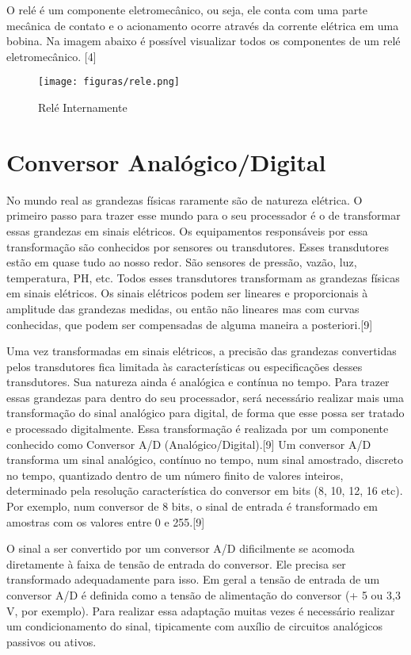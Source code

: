 O relé é um componente eletromecânico, ou seja, ele conta com uma parte mecânica de contato e o acionamento ocorre através da corrente elétrica em uma bobina. Na imagem abaixo é possível visualizar todos os componentes de um relé eletromecânico\cite{braga2012}. [4]

\begin{figure}[H]
	\centering
	\texttt{[image: figuras/rele.png]}
	\caption{Relé Internamente} \label{rele}
\end{figure}

\section{Conversor Analógico/Digital}

No mundo real as grandezas físicas raramente são de natureza elétrica. O primeiro passo para trazer esse mundo para o seu processador é o de transformar essas grandezas em sinais elétricos. Os equipamentos responsáveis por essa transformação são conhecidos por sensores ou transdutores. Esses transdutores estão em quase tudo ao nosso redor. São sensores de pressão, vazão, luz, temperatura, PH, etc. Todos esses transdutores transformam as grandezas físicas em sinais elétricos. Os sinais elétricos podem ser lineares e proporcionais à amplitude das grandezas medidas, ou então não lineares mas com curvas conhecidas, que podem ser compensadas de alguma maneira a posteriori\cite{braga2013}.[9]

Uma vez transformadas em sinais elétricos, a precisão das grandezas convertidas pelos transdutores fica limitada às características ou especificações desses transdutores. Sua natureza ainda é analógica e contínua no tempo. Para trazer essas grandezas para dentro do seu processador, será necessário realizar mais uma transformação do sinal analógico para digital, de forma que esse possa ser tratado e processado digitalmente. Essa transformação é realizada por um componente conhecido como Conversor A/D (Analógico/Digital)\cite{braga2013}.[9]
Um conversor A/D transforma um sinal analógico, contínuo no tempo, num sinal amostrado, discreto no tempo, quantizado dentro de um número finito de valores inteiros, determinado pela resolução característica do conversor em bits (8, 10, 12, 16 etc). Por exemplo, num conversor de 8 bits, o sinal de entrada é transformado em amostras com os valores entre 0 e 255\cite{braga2013}.[9]

O sinal a ser convertido por um conversor A/D dificilmente se acomoda diretamente à faixa de tensão de entrada do conversor. Ele precisa ser transformado adequadamente para isso. Em geral a tensão de entrada de um conversor A/D é definida como a tensão de alimentação do conversor (+ 5 ou 3,3 V, por exemplo). Para realizar essa adaptação muitas vezes é necessário realizar um condicionamento do sinal, tipicamente com auxílio de circuitos analógicos passivos ou ativos\cite{braga2013}.

